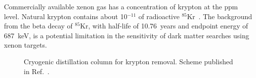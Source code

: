 Commercially available xenon gas has a concentration of krypton at the ppm level.
Natural krypton contains about 10$^{-11}$ of radioactive $^{85}$Kr~\cite{Kr85abundance_1, Kr85abundance_2}. 
The background from the beta decay of $^{85}$Kr, with half-life of 10.76~years and endpoint energy of 687~keV, is a potential limitation in the sensitivity of dark matter searches using xenon targets. 

\begin{figure}[!t]
\centering
{}
\caption[Cryogenic distillation column for krypton removal]{Cryogenic distillation column for krypton removal. Scheme published in Ref.~\cite{xe100-instrument}.}
\label{figDistillationColumn}
\end{figure}

